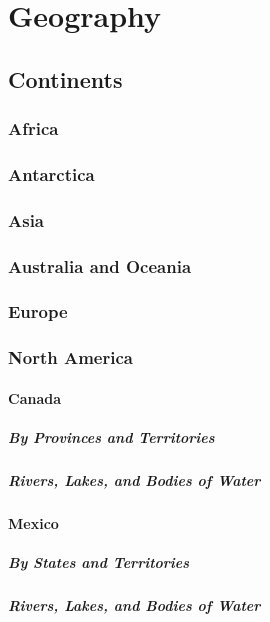 \chapter{Geography}
	\section{Continents}
	\subsection{Africa}
	\subsection{Antarctica}
	\subsection{Asia}
	\subsection{Australia and Oceania}
	\subsection{Europe}
	\subsection{North America}
		\subsubsection{Canada}
			\paragraph{By Provinces and Territories}
			\paragraph{Rivers, Lakes, and Bodies of Water}
			
		\subsubsection{Mexico}
						\paragraph{By States and Territories}
						
			\paragraph{Rivers, Lakes, and Bodies of Water}
		\newpage
